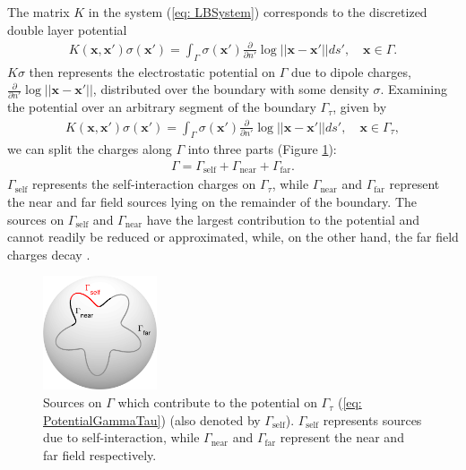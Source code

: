 \documentclass{sfuthesis}
\begin{document}
The matrix $K$ in the system (\ref{eq: LBSystem}) 
corresponds to the discretized double layer potential 
\begin{align*}
	K(\mathbf{x}, \mathbf{x}')\sigma(\mathbf{x'}) = \int_{\Gamma} \sigma(\mathbf{x}') \frac{\partial}{\partial n'} \log{||\mathbf{x}-\mathbf{x}'||} ds' , \quad \mathbf{x} \in \Gamma.
\end{align*}
$K\sigma$ then represents the electrostatic potential on $\Gamma$ due to dipole charges, $\frac{\partial}{\partial n'}\log||\mathbf{x}-\mathbf{x}'||$, distributed over the boundary with some density $\sigma$. 
Examining the potential over an arbitrary segment of the boundary $\Gamma_\tau$, given by 
\begin{align}
	K(\mathbf{x}, \mathbf{x}')\sigma(\mathbf{x}')=\int_\Gamma \sigma(\mathbf{x}') \frac{\partial}{\partial n'} \log{||\mathbf{x}-\mathbf{x}'||} ds' , \quad \mathbf{x} \in \Gamma_\tau, \label{eq: PotentialGammaTau} 
\end{align}
we can split the charges along $\Gamma$ into three parts \cite{CBMS} (Figure \ref{fig: SourcesSelfNearFar}): 
\begin{align*}
	\Gamma=\Gamma_{\text{self}} + \Gamma_{\text{near}} + \Gamma_{\text{far}}.
\end{align*}
$\Gamma_{\text{self}}$ represents the self-interaction charges on $\Gamma_\tau$, while $\Gamma_{\text{near}}$ and $\Gamma_{\text{far}}$ represent the near and far field sources lying on the remainder of the boundary. The sources on $\Gamma_{\text{self}}$ and $\Gamma_{\text{near}}$ have the largest contribution to the potential and cannot readily be reduced or approximated, while, on the other hand,  the far field charges decay \cite{ChengEtAl2005, MartRokh2005, HoGreen2012, Stein2007}. 

\begin{figure}[h]
  	\centering
   	\includegraphics[width=0.3\textwidth]{SourcesSelfNearFar}
    	\caption{Sources on $\Gamma$ which contribute to the potential on $\Gamma_\tau$ (\ref{eq: PotentialGammaTau}) (also denoted by $\Gamma_{\text{self}}$).  $\Gamma_{\text{self}}$ represents sources due to self-interaction, while $\Gamma_{\text{near}}$ and $\Gamma_{\text{far}}$ represent the near and far field respectively.}
   	\label{fig: SourcesSelfNearFar}
\end{figure}
\end{document}
